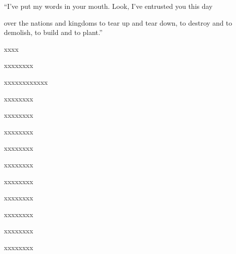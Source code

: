 \begin{inparaenum}
  \pb ``I've put my words in your mouth.\pa {} Look, I've entrusted you this day%
  
  \pa over the nations and kingdoms to tear up and tear down, to destroy and to demolish, to build and to plant.''\smallskip%
  
  
   xxxx\smallskip%
  
  \pb xxxx\pa xxxx%
  
  \pa {} xxxx\pa xxxx\pa xxxx%
  
  \pb xxxx\pa xxxx%
  
  \pb xxxx\pa xxxx%
  
  \pa {} xxxx\pa xxxx%
  
  \pb xxxx\pa xxxx%
  
  \pb {} xxxx\pa xxxx%
  
  \pa xxxx\pa xxxx%
  
  \pa {} xxxx\pa xxxx%
  
  \pb xxxx\pa xxxx%
  
  \pb xxxx\pa xxxx%
  
  \pa {} xxxx\pa xxxx%
\end{inparaenum}
